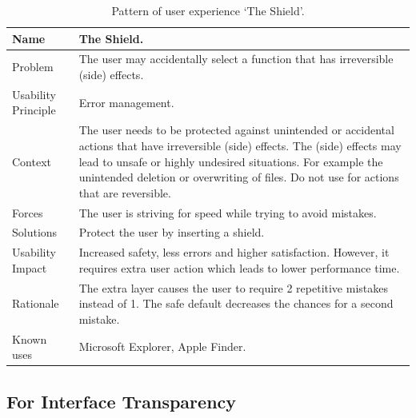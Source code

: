 \documentclass{acm_proc_article-sp}
\begin{document}
\begin{table}[!t]
  \caption{Pattern of user experience `The Shield'.}
  \label{tab:shield}
  \begin{center}
    \begin{tabular}{| p{} || p{} |}
      \hline
      Name & The Shield. \\ \hline

      Problem & The user may accidentally select a function that has
      irreversible (side) effects. \\ \hline

      Usability Principle & Error management. \\ \hline

      Context & The user needs to be protected against unintended or
      accidental actions that have irreversible (side) effects. The
      (side) effects may lead to unsafe or highly undesired
      situations. For example the unintended deletion or overwriting
      of files. Do not use for actions that are reversible. \\ \hline

      Forces & The user is striving for speed while trying to avoid
      mistakes. \\ \hline

      Solutions & Protect the user by inserting a shield. \\ \hline

      Usability Impact & Increased safety, less errors and higher
      satisfaction. However, it requires extra user action which leads
      to lower performance time. \\ \hline

      Rationale & The extra layer causes the user to require 2
      repetitive mistakes instead of 1. The safe default decreases the
      chances for a second mistake. \\ \hline

      Known uses & Microsoft Explorer, Apple Finder. \\ \hline
    \end{tabular}
  \end{center}
\end{table}

\subsection{For Interface Transparency}
\end{document}
